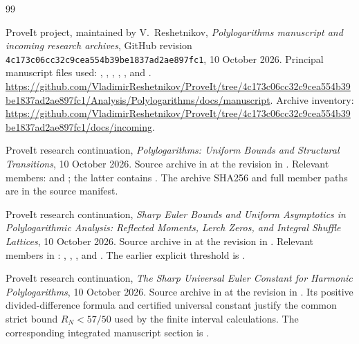 \clearpage
\begin{thebibliography}{99}
\small
\raggedright
{}

ProveIt project, maintained by V.~Reshetnikov,
\emph{Polylogarithms manuscript and incoming research archives},
GitHub revision
\texttt{4c173c06cc32c9cea554b39be1837ad2ae897fc1},
10 October 2026.
Principal manuscript files used:
,
,
,
,
, and
.
\url{https://github.com/VladimirReshetnikov/ProveIt/tree/4c173c06cc32c9cea554b39be1837ad2ae897fc1/Analysis/Polylogarithms/docs/manuscript}.
Archive inventory:
\url{https://github.com/VladimirReshetnikov/ProveIt/tree/4c173c06cc32c9cea554b39be1837ad2ae897fc1/docs/incoming}.

ProveIt research continuation,
\emph{Polylogarithms: Uniform Bounds and Structural Transitions},
10 October 2026.
Source archive
in  at the revision in \cite{baseline}.
Relevant members:
and ;
the latter contains .
The archive SHA256 and full member paths are in the source manifest.

ProveIt research continuation,
\emph{Sharp Euler Bounds and Uniform Asymptotics in Polylogarithmic
Analysis: Reflected Moments, Lerch Zeros, and Integral Shuffle Lattices},
10 October 2026.
Source archive
in  at the revision in \cite{baseline}.
Relevant members in :
, ,
, and
.
The earlier explicit threshold is .

ProveIt research continuation,
\emph{The Sharp Universal Euler Constant for Harmonic Polylogarithms},
10 October 2026.
Source archive 
in  at the revision in \cite{baseline}.
Its positive divided-difference formula and certified universal constant
justify the common strict bound $R_N<57/50$ used by the finite
interval calculations. The corresponding integrated manuscript
section is .


\end{thebibliography}
